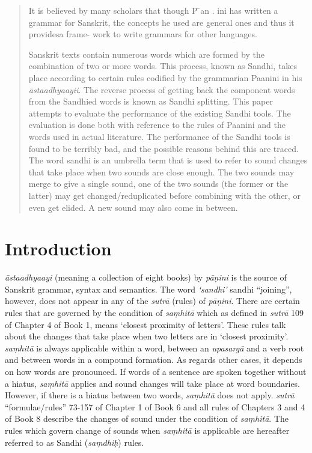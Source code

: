 \documentclass[11pt]{article}
\begin{document}
\begin{abstract}
	It is believed by many scholars that though P ̄an . ini has written a grammar for Sanskrit, the concepts he used are general ones and thus it providesa frame- work to write grammars for other languages.
	
	
  Sanskrit texts contain numerous words which are formed by the combination of two or more words. This process, known as Sandhi, takes place according to certain rules codified by the grammarian Paanini in his \textit{ \={a}staadhyaayii}. The reverse process of getting back the component words from the Sandhied words is known as Sandhi splitting. This paper attempts to evaluate the performance of the existing Sandhi tools.  The evaluation is done both with reference to the rules of Paanini and the words used in actual literature. The performance of the Sandhi tools is found to be terribly bad, and the possible reasons behind this are traced.  
The word sandhi is an umbrella term that is used to refer to sound changes that take place when two sounds are close enough. The two sounds may merge to give a single sound, one of the two sounds (the former or the latter) may get changed/reduplicated before combining with the other, or even get elided. A new sound may also come in between. 
\end{abstract}

\section{Introduction}

\textit{ \={a}staadhyaayi} (meaning a collection of eight books) by \textit{p\={a}\d{n}ini} is the source of Sanskrit grammar, syntax and semantics. The word  \textit{‘sandhi’} sandhi ``joining'', however, does not appear in any of the \textit{sutr\={a}} (rules) of \textit{p\={a}\d{n}ini}. There are certain rules that are governed by the condition of  \textit{sa\d{m}hit\={a}} which as defined in \textit{sutr\={a}} 109 of Chapter 4 of Book 1, means ‘closest proximity of letters’. These rules talk about the changes that take place when two letters are in ‘closest proximity’.
\textit{sa\d{m}hit\={a}} is always applicable within a word, between an \textit{upasarg\={a}} and a verb root and between words in a compound formation. As regards other cases, it depends on how words are pronounced. If words of a sentence are spoken together without a hiatus,  \textit{sa\d{m}hit\={a}} applies and sound changes will take place at word boundaries. However, if there is a hiatus between two words, \textit{sa\d{m}hit\={a}} does not apply. 
 \textit{sutr\={a}} ``formulae/rules'' 73-157 of Chapter 1 of Book 6 and all rules of Chapters 3 and 4 of Book 8 describe the changes of sound under the condition of \textit{sa\d{m}hit\={a}}. The rules which govern change of sounds when \textit{sa\d{m}hit\={a}} is applicable are hereafter referred to as Sandhi (\textit{sa\d{m}dhi\d{h}}) rules.
\end{document}
